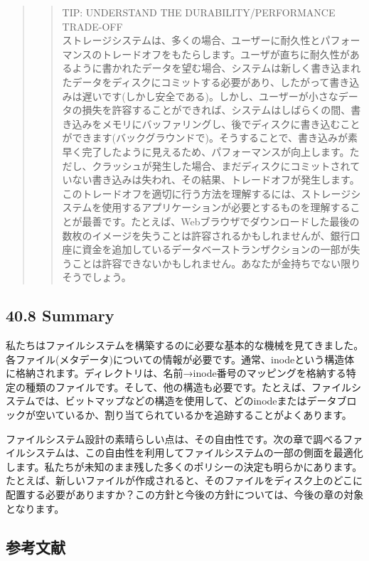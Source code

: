 \begin{quote}
\begin{quote}
TIP: UNDERSTAND THE DURABILITY/PERFORMANCE TRADE-OFF\\
ストレージシステムは、多くの場合、ユーザーに耐久性とパフォーマンスのトレードオフをもたらします。ユーザが直ちに耐久性があるように書かれたデータを望む場合、システムは新しく書き込まれたデータをディスクにコミットする必要があり、したがって書き込みは遅いです(しかし安全である)。しかし、ユーザーが小さなデータの損失を許容することができれば、システムはしばらくの間、書き込みをメモリにバッファリングし、後でディスクに書き込むことができます(バックグラウンドで)。そうすることで、書き込みが素早く完了したように見えるため、パフォーマンスが向上します。ただし、クラッシュが発生した場合、まだディスクにコミットされていない書き込みは失われ、その結果、トレードオフが発生します。このトレードオフを適切に行う方法を理解するには、ストレージシステムを使用するアプリケーションが必要とするものを理解することが最善です。たとえば、Webブラウザでダウンロードした最後の数枚のイメージを失うことは許容されるかもしれませんが、銀行口座に資金を追加しているデータベーストランザクションの一部が失うことは許容できないかもしれません。あなたが金持ちでない限りそうでしょう。
\end{quote}
\end{quote}

\hypertarget{summary-27}{%
\subsection*{40.8 Summary}\label{summary-27}}

私たちはファイルシステムを構築するのに必要な基本的な機械を見てきました。各ファイル(メタデータ)についての情報が必要です。通常、inodeという構造体に格納されます。ディレクトリは、名前→inode番号のマッピングを格納する特定の種類のファイルです。そして、他の構造も必要です。たとえば、ファイルシステムでは、ビットマップなどの構造を使用して、どのinodeまたはデータブロックが空いているか、割り当てられているかを追跡することがよくあります。

ファイルシステム設計の素晴らしい点は、その自由性です。次の章で調べるファイルシステムは、この自由性を利用してファイルシステムの一部の側面を最適化します。私たちが未知のまま残した多くのポリシーの決定も明らかにあります。たとえば、新しいファイルが作成されると、そのファイルをディスク上のどこに配置する必要がありますか？この方針と今後の方針については、今後の章の対象となります。

\hypertarget{ux53c2ux8003ux6587ux732e-27}{%
\subsection*{参考文献}\label{ux53c2ux8003ux6587ux732e-27}}

